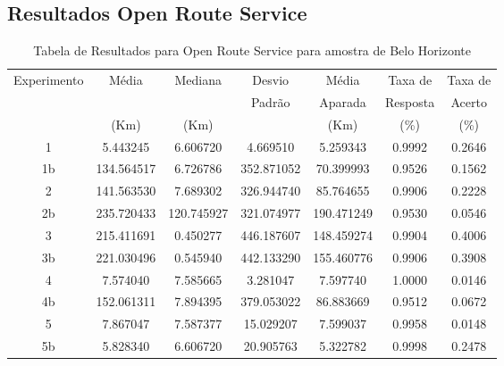 \begin{anexosenv}
\section{Resultados Open Route Service}

\begin{table}[ht]
\centering
\begin{tabular}{|c|c|c|c|c|c|c|}
\hline
Experimento & Média & Mediana & Desvio & Média & Taxa de & Taxa de \\
 & & & Padrão & Aparada & Resposta & Acerto \\
 & (Km) & (Km) & & (Km) & (\%) & (\%) \\ \hline
1 & 5.443245 & 6.606720 & 4.669510 & 5.259343 & 0.9992 & 0.2646 \\ \hline
1b & 134.564517 & 6.726786 & 352.871052 & 70.399993 & 0.9526 & 0.1562 \\ \hline
2 & 141.563530 & 7.689302 & 326.944740 & 85.764655 & 0.9906 & 0.2228 \\ \hline
2b & 235.720433 & 120.745927 & 321.074977 & 190.471249 & 0.9530 & 0.0546 \\ \hline
3 & 215.411691 & 0.450277 & 446.187607 & 148.459274 & 0.9904 & 0.4006 \\ \hline
3b & 221.030496 & 0.545940 & 442.133290 & 155.460776 & 0.9906 & 0.3908 \\ \hline
4 & 7.574040 & 7.585665 & 3.281047 & 7.597740 & 1.0000 & 0.0146 \\ \hline
4b & 152.061311 & 7.894395 & 379.053022 & 86.883669 & 0.9512 & 0.0672 \\ \hline
5 & 7.867047 & 7.587377 & 15.029207 & 7.599037 & 0.9958 & 0.0148 \\ \hline
5b & 5.828340 & 6.606720 & 20.905763 & 5.322782 & 0.9998 & 0.2478 \\ \hline
\end{tabular}
\caption{Tabela de Resultados para Open Route Service para amostra de Belo Horizonte}
\label{tab:orsBH}
\end{table}



\end{anexosenv}
